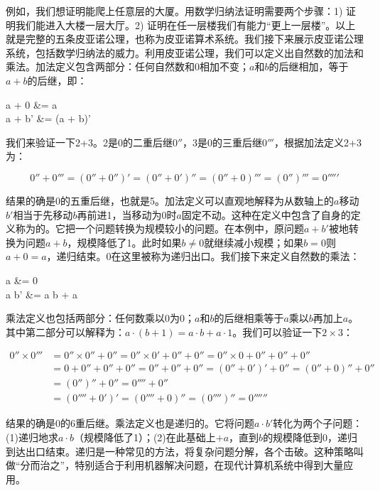 \documentclass[b5paper]{ctexart}
\begin{document}
例如，我们想证明能爬上任意层的大厦。用数学归纳法证明需要两个步骤：1) 证明我们能进入大楼一层大厅。2) 证明在任一层楼我们有能力“更上一层楼”。以上就是完整的五条皮亚诺公理，也称为皮亚诺算术系统。我们接下来展示皮亚诺公理系统，包括数学归纳法的威力。利用皮亚诺公理，我们可以定义出自然数的加法和乘法。加法定义包含两部分：任何自然数和0相加不变；$a$和$b$的后继相加，等于$a + b$的后继，即：

\be
\begin{laligned}
a + 0  &= a \\
a + b' &= (a + b)'
\end{laligned}
\label{eq:peano-add}
\ee

我们来验证一下2+3。2是0的二重后继$0''$，3是0的三重后继$0'''$，根据加法定义2+3为：

\[
0'' + 0''' = (0'' + 0'')' = (0'' + 0')'' = (0'' + 0)''' = (0'')''' = 0'''''
\]

结果的确是0的五重后继，也就是5。加法定义可以直观地解释为从数轴上的$a$移动$b'$相当于先移动$b$再前进1，当移动为0时$a$固定不动。这种在定义中包含了自身的定义称为的。它把一个问题转换为规模较小的问题。在本例中，原问题$a + b'$被地转换为问题$a + b$，规模降低了1。此时如果$b \ne 0$就继续减小规模；如果$b = 0$则$a + 0 = a$，递归结束。0在这里被称为递归出口。我们接下来定义自然数的乘法：

\be
\begin{laligned}
a  &= 0 \\
a \cdot b' &= a \cdot b + a
\end{laligned}
\label{eq:peano-multiply}
\ee

乘法定义也包括两部分：任何数乘以0为0；$a$和$b$的后继相乘等于$a$乘以$b$再加上$a$。其中第二部分可以解释为：$a \cdot (b+1) = a \cdot b + a \cdot 1$。我们可以验证一下$2 \times 3$：

\begin{align*}
0'' \times 0''' & = 0'' \times 0'' + 0'' = 0'' \times 0' + 0'' + 0'' = 0'' \times 0 + 0'' + 0'' + 0'' \\
                & = 0 + 0'' + 0'' + 0'' = 0'' + 0'' + 0'' = (0'' + 0')' + 0'' = (0'' + 0)'' + 0'' \\
                & = (0'')'' + 0'' = 0'''' + 0'' \\
                & = (0'''' + 0')' = (0'''' + 0)'' = (0'''')'' = 0''''''
\end{align*}

结果的确是0的6重后继。乘法定义也是递归的。它将问题$a \cdot b'$转化为两个子问题：(1)递归地求$a \cdot b$（规模降低了1）；(2)在此基础上$+a$，直到$b$的规模降低到0，递归到达出口结束。递归是一种常见的方法，将复杂问题分解，各个击破。这种策略叫做“分而治之”，特别适合于利用机器解决问题，在现代计算机系统中得到大量应用。
\end{document}
